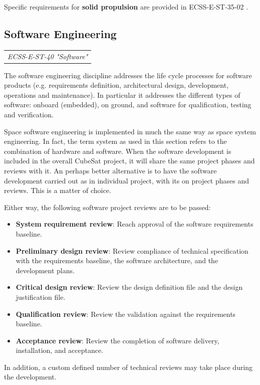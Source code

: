 Specific requirements for \textbf{solid propulsion} are provided in ECSS-E-ST-35-02 \cite{ECSS-E-ST-35-02}. 

\subsection{Software Engineering}

\begin{tabular}{l}
\textit{ECSS-E-ST-40 "Software" \cite{ECSS-E-ST-40} }
\end{tabular}

The software engineering discipline addresses the life cycle processes for software products (e.g. requirements definition, architectural design, development, operations and maintenance). In particular it addresses the different types of software: onboard (embedded), on ground, and software for qualification, testing and verification. 

Space software engineering is implemented in much the same way as space system engineering. In fact, the term system as used in this section refers to the combination of hardware and software. When the software development is included in the overall CubeSat project, it will share the same project phases and reviews with it. An perhaps better alternative is to have the software development carried out as in individual project, with its on project phases and reviews. This is  a matter of choice. 

Either way, the following software project reviews are to be passed:

\begin{itemize}
\item \textbf{System requirement review}: Reach approval of the software requirements baseline.
\item \textbf{Preliminary design review}: Review compliance of technical specification with the requirements baseline, the software architecture, and the development plans.
\item \textbf{Critical design review}: Review the design definition file and the design justification file.
\item \textbf{Qualification review}: Review the validation against the requirements baseline.
\item \textbf{Acceptance review}: Review the completion of software delivery, installation, and acceptance.
\end{itemize}

In addition, a custom defined number of technical reviews may take place during the development. 

